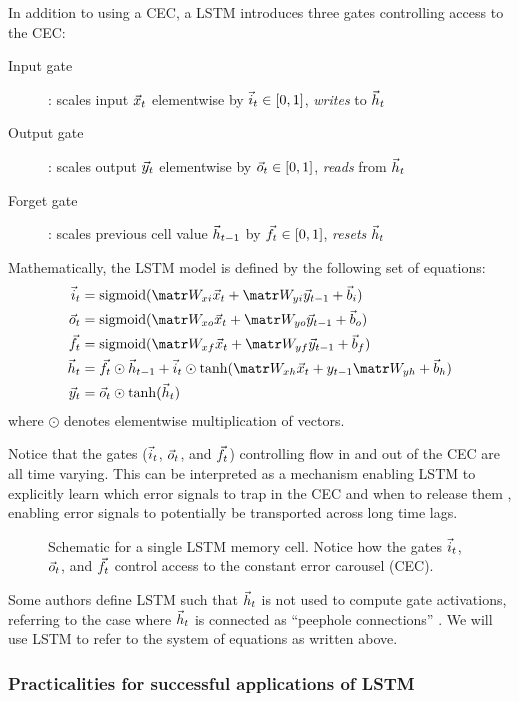 In addition to using a CEC, a LSTM introduces three gates controlling access to the CEC:
\begin{description}
  \item[Input gate]: scales input $\vec{x}_t$ elementwise by $\vec{i}_t \in [0,1]$, \emph{writes} to $\vec{h}_t$
  \item[Output gate]: scales output $\vec{y}_t$ elementwise by $\vec{o}_t \in [0,1]$, \emph{reads} from $\vec{h}_t$
  \item[Forget gate]: scales previous cell value $\vec{h}_{t-1}$ by $\vec{f}_t \in [0,1]$, \emph{resets} $\vec{h}_t$
\end{description}

Mathematically, the LSTM model is defined by the following set of equations:
\begin{align}
    \i_t &= \sigmoid(\W_{xi} \x_t + \W_{yi} \y_{t-1} + \b_i) \\
    \o_t &= \sigmoid(\W_{xo} \x_t + \W_{yo} \y_{t-1} + \b_o) \\
    \f_t &= \sigmoid(\W_{xf} \x_t + \W_{yf} \y_{t-1} + \b_f) \\
    \h_t &= \f_t \odot \h_{t-1} + \i_t \odot \tanh(\W_{xh}\x_t + y_{t-1} \W_{yh} + \b_h) \\
    \y_t &= \o_t \odot \tanh(\h_t)
\end{align}
where $\odot$ denotes elementwise multiplication of vectors.

Notice that the gates ($\vec{i}_t$, $\vec{o}_t$, and $\vec{f}_t$) controlling flow in and out
of the CEC are all time varying. This can be interpreted as a mechanism
enabling LSTM to explicitly learn which error signals to trap in the CEC and
when to release them \citep{hochreiter1997long}, enabling error signals to
potentially be transported across long time lags.

\begin{figure}[tb]
    \centering
    
    \caption{Schematic for a single LSTM memory cell. Notice how the gates $\vec{i}_t$, $\vec{o}_t$, and $\vec{f}_t$ control access to the constant error carousel (CEC).}
    \label{fig:lstm-cell}
\end{figure}

Some authors define LSTM such that $\vec{h}_t$ is not used to compute gate
activations, referring to the case where $\vec{h}_t$ is connected as ``peephole
connections'' \citep{gers2000recurrent}. We will use LSTM to refer to the
system of equations as written above.

\subsubsection{Practicalities for successful applications of LSTM}

